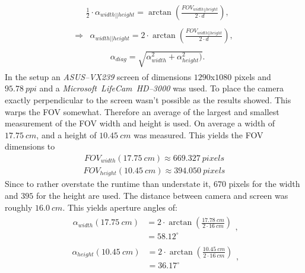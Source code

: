 \documentclass[journal,final,a4paper,twoside]{PS}
\begin{document}
\begin{align}\begin{split}
&\frac{1}{2}\cdot\alpha_{width||height}  =  \arctan \left(\frac{FOV_{width||height }}{2\cdot d} \right),
\end{split}
\end{align}
\begin{align}\begin{split}
\Rightarrow &\alpha_{width||height} = 2 \cdot \arctan \left(\frac{FOV_{width||height }}{2\cdot d} \right),
\end{split}
\end{align}
\begin{align}\begin{split}
&\alpha_{diag} = \sqrt{\alpha_{width}^2 + \alpha_{height}^2)}.
\end{split}
\end{align}
In the setup an \emph{ASUS--VX239} screen of dimensions $1290$x$1080$ pixels and $95.78~ppi$ and a \emph{Microsoft~LifeCam~HD--3000} was used. To place the camera exactly perpendicular to the screen wasn't possible as the results showed. This warps the FOV somewhat. Therefore an average of the largest and smallest measurement of the FOV width and height is used. On average a width of $17.75~cm$, and a height of $10.45~cm$ was measured. This yields the FOV dimensions to
\begin{align*}
FOV_{width}(17.75~cm) \approx 669.327~pixels
\end{align*}
\begin{align*}
FOV_{height}(10.45~cm) \approx 394.050~pixels
\end{align*}
Since to rather overstate the runtime than understate it, $670$ pixels for the width and $395$ for the height are used. The distance between camera and screen was roughly $16.0~cm$. This yields aperture angles of:
\begin{align}\begin{split}
\alpha_{width}(17.75~cm)&= 2 \cdot \arctan\left(\frac{17.78~cm}{2 \cdot 16~cm}\right) \\&= 58.12^{\circ}\end{split},
\end{align}
\begin{align}\begin{split}
\alpha_{height}(10.45~cm) &= 2 \cdot\arctan\left(\frac{10.45~cm}{2 \cdot 16~cm}\right) \\&= 36.17^{\circ}\end{split},
\end{align}
\end{document}

